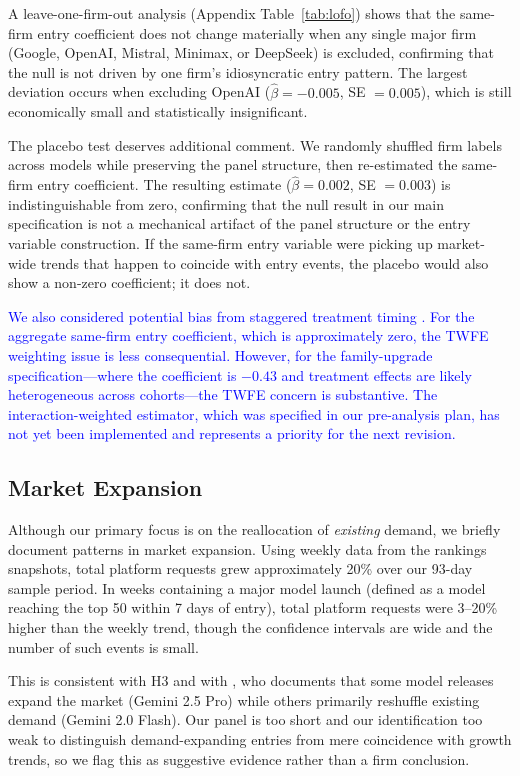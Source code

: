 \documentclass[11pt, a4paper]{article}
\begin{document}
A leave-one-firm-out analysis (Appendix Table~\ref{tab:lofo}) shows that the same-firm entry coefficient does not change materially when any single major firm (Google, OpenAI, Mistral, Minimax, or DeepSeek) is excluded, confirming that the null is not driven by one firm's idiosyncratic entry pattern. The largest deviation occurs when excluding OpenAI ($\hat{\beta} = -0.005$, SE $= 0.005$), which is still economically small and statistically insignificant.

The placebo test deserves additional comment. We randomly shuffled firm labels across models while preserving the panel structure, then re-estimated the same-firm entry coefficient. The resulting estimate ($\hat{\beta} = 0.002$, SE $= 0.003$) is indistinguishable from zero, confirming that the null result in our main specification is not a mechanical artifact of the panel structure or the entry variable construction. If the same-firm entry variable were picking up market-wide trends that happen to coincide with entry events, the placebo would also show a non-zero coefficient; it does not.

\textcolor{blue}{We also considered potential bias from staggered treatment timing \citep{dechaisemartin2020twoway, goodmanbacon2021}. For the aggregate same-firm entry coefficient, which is approximately zero, the TWFE weighting issue is less consequential. However, for the family-upgrade specification---where the coefficient is $-0.43$ and treatment effects are likely heterogeneous across cohorts---the TWFE concern is substantive. The \citet{sunAbraham2021} interaction-weighted estimator, which was specified in our pre-analysis plan, has not yet been implemented and represents a priority for the next revision.}

\subsection{Market Expansion}

Although our primary focus is on the reallocation of \emph{existing} demand, we briefly document patterns in market expansion. Using weekly data from the rankings snapshots, total platform requests grew approximately 20\% over our 93-day sample period. In weeks containing a major model launch (defined as a model reaching the top 50 within 7 days of entry), total platform requests were 3--20\% higher than the weekly trend, though the confidence intervals are wide and the number of such events is small.

This is consistent with H3 and with \citet{fradkin2025demand}, who documents that some model releases expand the market (Gemini 2.5 Pro) while others primarily reshuffle existing demand (Gemini 2.0 Flash). Our panel is too short and our identification too weak to distinguish demand-expanding entries from mere coincidence with growth trends, so we flag this as suggestive evidence rather than a firm conclusion.
\end{document}
